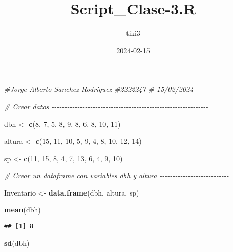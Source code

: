 \documentclass[
]{article}
\title{Script\_Clase-3.R}
\author{tiki3}
\date{2024-02-15}
\newenvironment{Shaded}{\begin{snugshade}}{\end{snugshade}}
\newcommand{\CommentTok}[1]{\textcolor[rgb]{0.56,0.35,0.01}{\textit{#1}}}
\newcommand{\DecValTok}[1]{\textcolor[rgb]{0.00,0.00,0.81}{#1}}
\newcommand{\FunctionTok}[1]{\textcolor[rgb]{0.13,0.29,0.53}{\textbf{#1}}}
\newcommand{\NormalTok}[1]{#1}
\newcommand{\OtherTok}[1]{\textcolor[rgb]{0.56,0.35,0.01}{#1}}
\begin{document}
\maketitle

\begin{Shaded}
\begin{Highlighting}[]
\CommentTok{\#Jorge Alberto Sanchez Rodriguez}
\CommentTok{\#2222247}
\CommentTok{\# 15/02/2024}

\CommentTok{\# Crear datos {-}{-}{-}{-}{-}{-}{-}{-}{-}{-}{-}{-}{-}{-}{-}{-}{-}{-}{-}{-}{-}{-}{-}{-}{-}{-}{-}{-}{-}{-}{-}{-}{-}{-}{-}{-}{-}{-}{-}{-}{-}{-}{-}{-}{-}{-}{-}{-}{-}{-}{-}{-}{-}{-}{-}{-}{-}{-}{-}{-}{-}}

\NormalTok{dbh }\OtherTok{\textless{}{-}} \FunctionTok{c}\NormalTok{(}\DecValTok{8}\NormalTok{, }\DecValTok{7}\NormalTok{, }\DecValTok{5}\NormalTok{, }\DecValTok{8}\NormalTok{, }\DecValTok{9}\NormalTok{, }\DecValTok{8}\NormalTok{, }\DecValTok{6}\NormalTok{, }\DecValTok{8}\NormalTok{, }\DecValTok{10}\NormalTok{, }\DecValTok{11}\NormalTok{)}

\NormalTok{altura }\OtherTok{\textless{}{-}} \FunctionTok{c}\NormalTok{(}\DecValTok{15}\NormalTok{, }\DecValTok{11}\NormalTok{, }\DecValTok{10}\NormalTok{, }\DecValTok{5}\NormalTok{, }\DecValTok{9}\NormalTok{, }\DecValTok{4}\NormalTok{, }\DecValTok{8}\NormalTok{, }\DecValTok{10}\NormalTok{, }\DecValTok{12}\NormalTok{, }\DecValTok{14}\NormalTok{)}

\NormalTok{sp }\OtherTok{\textless{}{-}} \FunctionTok{c}\NormalTok{(}\DecValTok{11}\NormalTok{, }\DecValTok{15}\NormalTok{, }\DecValTok{8}\NormalTok{, }\DecValTok{4}\NormalTok{, }\DecValTok{7}\NormalTok{, }\DecValTok{13}\NormalTok{, }\DecValTok{6}\NormalTok{, }\DecValTok{4}\NormalTok{, }\DecValTok{9}\NormalTok{, }\DecValTok{10}\NormalTok{)}

\CommentTok{\# Crear un dataframe con variables dbh y altura {-}{-}{-}{-}{-}{-}{-}{-}{-}{-}{-}{-}{-}{-}{-}{-}{-}{-}{-}{-}{-}{-}{-}{-}{-}{-}{-}}

\NormalTok{Inventario }\OtherTok{\textless{}{-}} \FunctionTok{data.frame}\NormalTok{(dbh, altura, sp)}

\FunctionTok{mean}\NormalTok{(dbh)}
\end{Highlighting}
\end{Shaded}

\begin{verbatim}
## [1] 8
\end{verbatim}

\begin{Shaded}
\begin{Highlighting}[]
\FunctionTok{sd}\NormalTok{(dbh)}
\end{Highlighting}
\end{Shaded}
\end{document}
